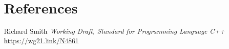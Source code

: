 \documentclass{wg21}
\begin{document}
\section{References}
\renewcommand{\section}[2]{}%



\begin{thebibliography}{9}

    Richard Smith
    \emph{Working Draft, Standard for Programming Language C++}\newline
    \url{https://wg21.link/N4861}

\end{thebibliography}
\end{document}
